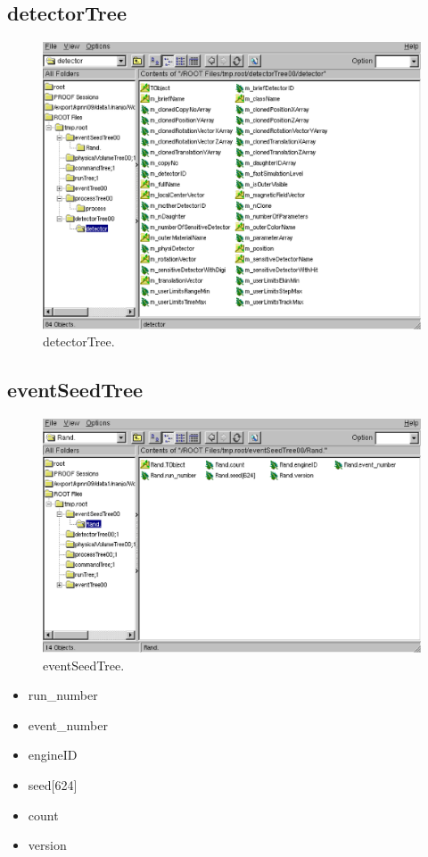 \documentclass[a4paper,12pt]{article}
\begin{document}
  \subsection{detectorTree}
  \begin{figure}[H]
   \begin{center}
    \includegraphics[scale=0.5]{xwd/de.eps}
   \end{center}
   \caption{detectorTree.}
  \end{figure}

  \subsection{eventSeedTree}
  \begin{figure}[H]
   \begin{center}
    \includegraphics[scale=0.5]{xwd/rn.eps}
   \end{center}
   \caption{eventSeedTree.}
  \end{figure}
  \begin{itemize}
   \item run\_number
   \item event\_number
   \item engineID
   \item seed[624]
   \item count
   \item version
  \end{itemize}
   
\end{document}
